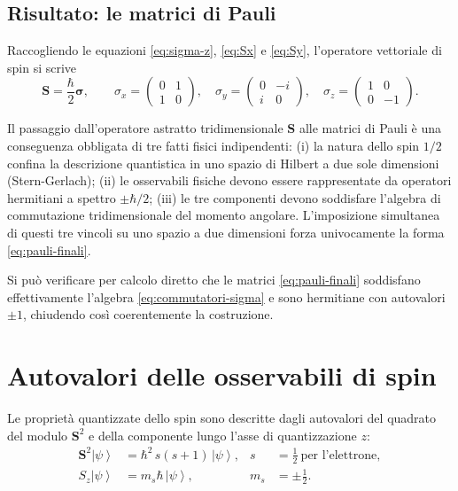 \documentclass[11pt,a4paper]{article}
\newcommand{\ket}[1]{\left|#1\right\rangle}
\begin{document}
\subsection{Risultato: le matrici di Pauli}

Raccogliendo le equazioni \eqref{eq:sigma-z}, \eqref{eq:Sx} e \eqref{eq:Sy}, l'operatore vettoriale di spin si scrive
\begin{equation}
\mathbf{S} = \frac{\hbar}{2}\boldsymbol{\sigma}, \qquad
\sigma_x=\begin{pmatrix}0&1\\1&0\end{pmatrix}, \quad
\sigma_y=\begin{pmatrix}0&-i\\i&0\end{pmatrix}, \quad
\sigma_z=\begin{pmatrix}1&0\\0&-1\end{pmatrix}.
\label{eq:pauli-finali}
\end{equation}

\begin{sintesi}
Il passaggio dall'operatore astratto tridimensionale $\mathbf{S}$ alle matrici di Pauli è una conseguenza obbligata di tre fatti fisici indipendenti: (i) la natura dello spin $1/2$ confina la descrizione quantistica in uno spazio di Hilbert a due sole dimensioni (Stern-Gerlach); (ii) le osservabili fisiche devono essere rappresentate da operatori hermitiani a spettro $\pm\hbar/2$; (iii) le tre componenti devono soddisfare l'algebra di commutazione tridimensionale del momento angolare. L'imposizione simultanea di questi tre vincoli su uno spazio a due dimensioni forza univocamente la forma \eqref{eq:pauli-finali}.
\end{sintesi}

Si può verificare per calcolo diretto che le matrici \eqref{eq:pauli-finali} soddisfano effettivamente l'algebra \eqref{eq:commutatori-sigma} e sono hermitiane con autovalori $\pm1$, chiudendo così coerentemente la costruzione.

\section{Autovalori delle osservabili di spin}

Le proprietà quantizzate dello spin sono descritte dagli autovalori del quadrato del modulo $\mathbf{S}^2$ e della componente lungo l'asse di quantizzazione $z$:
\begin{align}
\mathbf{S}^2\ket{\psi} &= \hbar^2\,s(s+1)\,\ket{\psi}, & s&=\tfrac12 \ \text{per l'elettrone}, \label{eq:S2}\\
S_z\ket{\psi} &= m_s\hbar\,\ket{\psi}, & m_s&=\pm\tfrac12. \label{eq:Sz-autoval}
\end{align}
\end{document}
